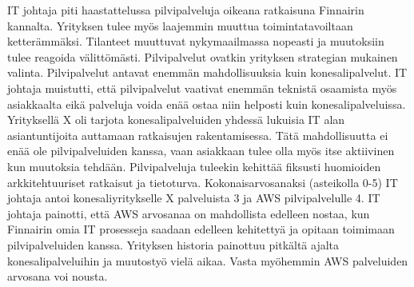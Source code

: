IT johtaja piti haastattelussa pilvipalveluja oikeana ratkaisuna Finnairin kannalta. Yrityksen tulee myös laajemmin muuttua toimintatavoiltaan ketterämmäksi. Tilanteet muuttuvat nykymaailmassa nopeasti ja muutoksiin tulee reagoida välittömästi. Pilvipalvelut ovatkin yrityksen strategian mukainen valinta. Pilvipalvelut antavat enemmän mahdollisuuksia kuin konesalipalvelut. IT johtaja muistutti, että pilvipalvelut vaativat enemmän teknistä osaamista myös asiakkaalta eikä palveluja voida enää ostaa niin helposti kuin konesalipalveluissa. Yrityksellä X oli tarjota konesalipalveluiden yhdessä lukuisia IT alan asiantuntijoita auttamaan ratkaisujen rakentamisessa. Tätä mahdollisuutta ei enää ole pilvipalveluiden kanssa, vaan asiakkaan tulee olla myös itse aktiivinen kun muutoksia tehdään. Pilvipalveluja tuleekin kehittää fiksusti huomioiden arkkitehtuuriset ratkaisut ja tietoturva. Kokonaisarvosanaksi (asteikolla 0-5) IT johtaja antoi konesaliyritykselle X palveluista 3 ja AWS pilvipalvelulle 4. IT johtaja painotti, että AWS arvosanaa on mahdollista edelleen nostaa, kun Finnairin omia IT prosesseja saadaan edelleen kehitettyä ja opitaan toimimaan pilvipalveluiden kanssa. Yrityksen historia painottuu pitkältä ajalta konesalipalveluihin ja muutostyö vielä aikaa. Vasta myöhemmin AWS palveluiden arvosana voi nousta.  